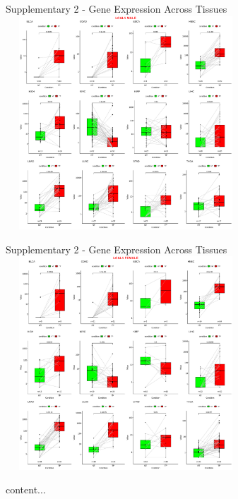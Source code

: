 \documentclass{beamer}
\begin{document}
	\begin{frame}{Supplementary 2 - Gene Expression Across Tissues}
		\centering \includegraphics[width=9cm, height=8cm]{all_cancerspairedboxplot_cancertype_0.9_lcal1male.png}
	\end{frame}

	\begin{frame}{Supplementary 2 - Gene Expression Across Tissues}
		\centering \includegraphics[width=9cm, height=8cm]{all_cancerspairedboxplot_cancertype_0.9_lcal1female.png}
	\end{frame}

	\begin{frame}
		content...
	\end{frame}
	
\end{document}
